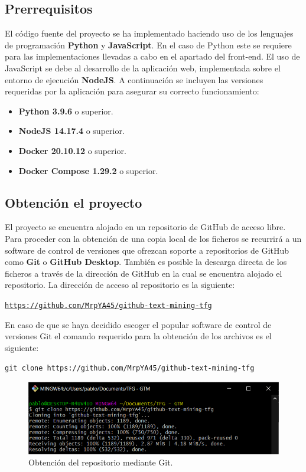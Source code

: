 \subsection{Prerrequisitos}
El código fuente del proyecto se ha implementado haciendo uso de los lenguajes de programación \textbf{Python} y \textbf{JavaScript}. En el caso de Python este se requiere para las implementaciones llevadas a cabo en el apartado del front-end. El uso de JavaScript se debe al desarrollo de la aplicación web, implementada sobre el entorno de ejecución \textbf{NodeJS}. A continuación se incluyen las versiones requeridas por la aplicación para asegurar su correcto funcionamiento:
\begin{itemize}
    \item \textbf{Python 3.9.6} o superior.
    \item \textbf{NodeJS 14.17.4} o superior.
    \item \textbf{Docker 20.10.12} o superior.
    \item \textbf{Docker Compose 1.29.2} o superior.
\end{itemize}

\subsection{Obtención el proyecto}

El proyecto se encuentra alojado en un repositorio de GitHub de acceso libre. Para proceder con la obtención de una copia local de los ficheros se recurrirá a un software de control de versiones que ofrezcan soporte a repositorios de GitHub como \textbf{Git} o \textbf{GitHub Desktop}. También es posible la descarga directa de los ficheros a través de la dirección de GitHub en la cual se encuentra alojado el repositorio. La dirección de acceso al repositorio es la siguiente:

\vspace{0.5cm}
\centerline{\texttt{\url{https://github.com/MrpYA45/github-text-mining-tfg}}}
\vspace{0.4cm}

En caso de que se haya decidido escoger el popular software de control de versiones Git el comando requerido para la obtención de los archivos es el siguiente:

\vspace{0.5cm}
\centerline{\texttt{git clone https://github.com/MrpYA45/github-text-mining-tfg}}
\vspace{0.4cm}

\begin{figure}[!ht]
	\centering
    \includegraphics[width=\textwidth]{img/git_gtm.png}
	\caption{Obtención del repositorio mediante Git.}
	\label{fig:git_gtm_mu}
\end{figure}

